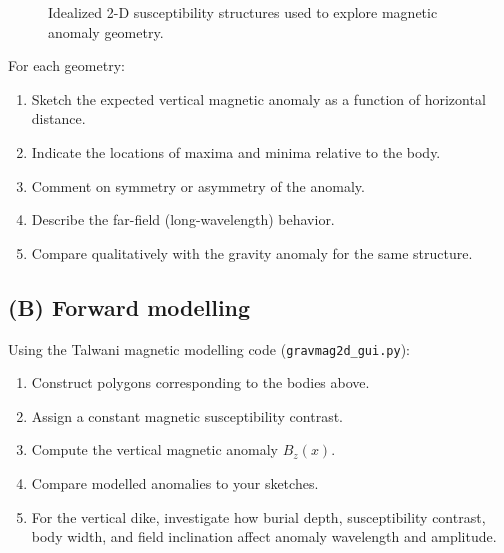 \documentclass[11pt,a4paper]{article}
\begin{document}
\begin{figure}[h!]
\begin{minipage}[t]{0.48\textwidth}
\end{minipage}

\caption{Idealized 2-D susceptibility structures used to explore magnetic anomaly geometry.}
\end{figure}

For each geometry:
\begin{enumerate}
    \item Sketch the expected vertical magnetic anomaly as a function of horizontal distance.
    \item Indicate the locations of maxima and minima relative to the body.
    \item Comment on symmetry or asymmetry of the anomaly.
    \item Describe the far-field (long-wavelength) behavior.
    \item Compare qualitatively with the gravity anomaly for the same structure.
\end{enumerate}


\subsection*{(B) Forward modelling}

Using the Talwani magnetic modelling code (\verb+gravmag2d_gui.py+):

\begin{enumerate}[itemsep=-0.5em]
    \item Construct polygons corresponding to the bodies above.
    \item Assign a constant magnetic susceptibility contrast.
    \item Compute the vertical magnetic anomaly $B_z(x)$.
    \item Compare modelled anomalies to your sketches.
    \item For the vertical dike, investigate how burial depth, susceptibility contrast,
          body width, and field inclination affect anomaly wavelength and amplitude.
\end{enumerate}
\end{document}
